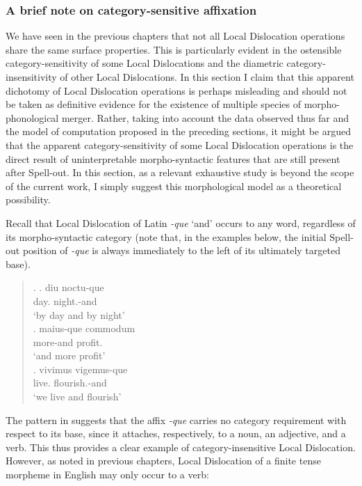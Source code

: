\subsubsection{A brief note on category-sensitive affixation}\label{cat_sens_sec}
We have seen in the previous chapters that not all Local Dislocation operations share the same surface properties. This is particularly evident in the ostensible category-sensitivity of some Local Dislocations and the diametric category-insensitivity of other Local Dislocations. In this section I claim that this apparent dichotomy of Local Dislocation operations is perhaps misleading and should not be taken as definitive evidence for the existence of multiple species of morpho-phonological merger. Rather, taking into account the data observed thus far and the model of computation proposed in the preceding sections, it might be argued that the apparent category-sensitivity of some Local Dislocation operations is the direct result of uninterpretable morpho-syntactic features that are still present after Spell-out. In this section, as a relevant exhaustive study is beyond the scope of the current work, I simply suggest this morphological model as a theoretical possibility.

Recall that Local Dislocation of Latin {\it -que} `and' occurs to any word, regardless of its morpho-syntactic category (note that, in the examples below, the initial Spell-out position of {\it -que} is always immediately to the left of its ultimately targeted base).

\singlespacing
\begin{quote} 
\begin{minipage}{5.5in}
\ex.
\ag. diu noctu-que\\
day. night.\mbox{}-and\\
`by day and by night'\\
\bg. maius-que commodum\\
more-and profit.\\
`and more profit'\\
\cg. vivimus vigemus-que\\
live. flourish.\mbox{}-and\\
`we live and flourish'\\

\end{minipage}
\end{quote}
\onehalfspacing
The pattern in \Last suggests that the affix {\it -que} carries no category requirement with respect to its base, since it attaches, respectively, to a noun, an adjective, and a verb. This thus provides a clear example of category-insensitive Local Dislocation. However, as noted in previous chapters, Local Dislocation of a finite tense morpheme in English may only occur to a verb:


